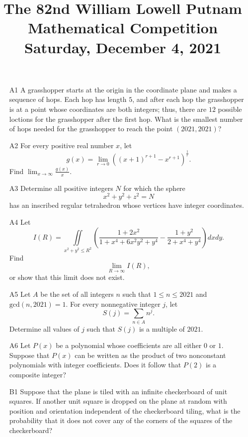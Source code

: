 \documentclass[amssymb,twocolumn,pra,10pt,aps,nofootinbib]{revtex4-1}
\begin{document}
\title{The 82nd William Lowell Putnam Mathematical Competition \\
    Saturday, December 4, 2021}
\maketitle

\begin{itemize}

\item[A1]
A grasshopper starts at the origin in the coordinate plane and makes a sequence of hops. Each hop has length $5$, and after each hop the grasshopper is at a point whose coordinates are both integers; thus, there are $12$ possible loctions for the grasshopper after the first hop. What is the smallest number of hops needed for the grasshopper to reach the point $(2021,2021)$?

\item[A2]
For every positive real number $x$, let
\[
g(x)=\lim_{r\to 0}  ((x+1)^{r+1}-x^{r+1})^{\frac{1}{r}}.
\]
Find $\lim_{x\to \infty}\frac{g(x)}{x}$.

\item[A3]
Determine all positive integers $N$ for which the sphere
\[
x^2+y^2+z^2=N
\]
has an inscribed regular tetrahedron whose vertices have integer coordinates.

\item[A4]
Let
\[
I(R)=\iint\limits_{x^2+y^2 \le R^2}\left(\frac{1+2x^2}{1+x^4+6x^2y^2+y^4}-\frac{1+y^2}{2+x^4+y^4}\right) dx dy.
\]
Find
\[
\lim_{R \to \infty}I(R),
\]
or show that this limit does not exist.

\item[A5]
Let $A$ be the set of all integers $n$ such that $1 \le n \le 2021$ and $\text{gcd}(n,2021)=1$. For every nonnegative integer $j$, let
\[
S(j)=\sum_{n \in A}n^j.
\]
Determine all values of $j$ such that $S(j)$ is a multiple of $2021$.

\item[A6]
Let $P(x)$ be a polynomial whose coefficients are all either $0$ or $1$. Suppose that $P(x)$ can be written as the product of two nonconstant polynomials with integer coefficients. Does it follow that $P(2)$ is a composite integer?

\item[B1]
Suppose that the plane is tiled with an infinite checkerboard of unit squares. If another unit square is dropped on the plane at random with position and orientation independent of the checkerboard tiling, what is the probability that it does not cover any of the corners of the squares of the checkerboard?


\end{itemize}
\end{document}
